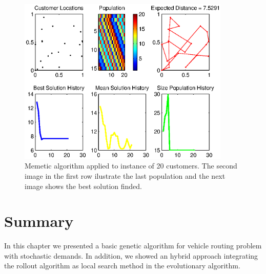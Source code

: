 \begin{figure}[!htbp]
  \begin{center}
   \includegraphics[width=0.9\textwidth]{Images/Chapter3/mvi_20r4_m_memetic.eps}
  \end{center}
    \caption{Memetic algorithm applied to instance of 20 customers. The second image in the first row ilustrate the last population and the next image shows the best solution finded. }\label{fig:memetic_mvi_20r4_m}
\end{figure}

\section{Summary}

In this chapter we presented a basic genetic algorithm for vehicle routing problem with stochastic demands. In addition, we showed an hybrid approach integrating the rollout algorithm as local search method in the evolutionary algorithm.